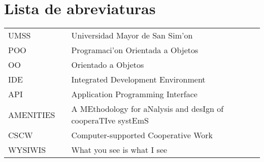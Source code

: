 \chapter{Lista de abreviaturas}

\begin{center}
\begin{tabular}{lcl}
UMSS   &              & Universidad Mayor de San Sim'on \\
POO    &              & Programaci'on Orientada a Objetos \\
OO     &              & Orientado a Objetos \\
IDE    &              & Integrated Development Environment \\
API    &              & Application Programming Interface \\
AMENITIES &            & A MEthodology for aNalysis and desIgn of cooperaTIve systEmS \\
CSCW   &              & Computer-supported Cooperative Work \\
WYSIWIS	&             & What you see is what I see  
\end{tabular}
\end{center}